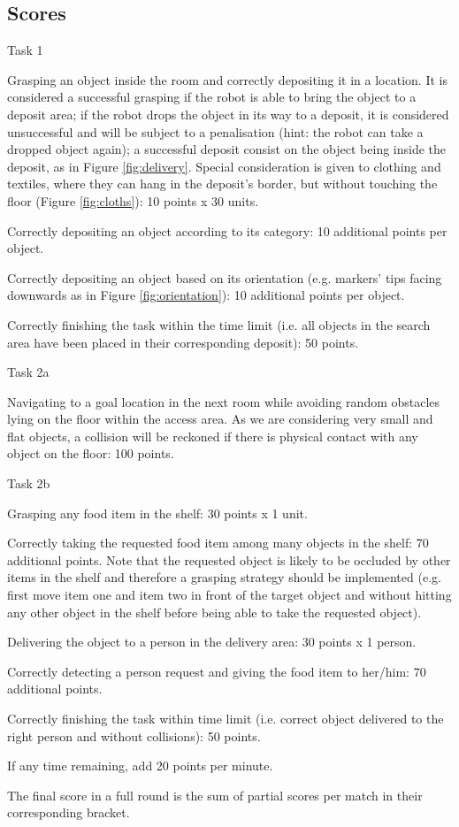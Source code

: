\documentclass{article}
\newcommand{\SubItem}[1]{
    {\setlength\itemindent{15pt} \item[-] #1}
}
\begin{document}
\subsection{Scores} \label{sec:scores}

\begin{itemize}
    \item Task 1
        \SubItem{Grasping an object inside the room and correctly depositing it in a location. It is considered a successful grasping if the robot is able to bring the object to a deposit area; if the robot drops the object in its way to a deposit, it is considered unsuccessful and will be subject to a penalisation (hint: the robot can take a dropped object again); a successful deposit consist on the object being inside the deposit, as in Figure \ref{fig:delivery}. Special consideration is given to clothing and textiles, where they can hang in the deposit's border, but without touching the floor (Figure \ref{fig:cloths}): 10 points x 30 units.}
        \SubItem{Correctly depositing an object according to its category: 10 additional points per object.}
        \SubItem{Correctly depositing an object based on its orientation (e.g. markers' tips facing downwards as in Figure \ref{fig:orientation}): 10 additional points per object.}
        \SubItem{Correctly finishing the task within the time limit (i.e. all objects in the search area have been placed in their corresponding deposit): 50 points.}
    \item Task 2a
        \SubItem{Navigating to a goal location in the next room while avoiding random obstacles lying on the floor within the access area. As we are considering very small and flat objects, a collision will be reckoned if there is physical contact with any object on the floor: 100 points.}
    \item Task 2b
        \SubItem{Grasping any food item in the shelf: 30 points x 1 unit.}
        \SubItem{Correctly taking the requested food item among many objects in the shelf: 70 additional points. Note that the requested object is likely to be occluded by other items in the shelf and therefore a grasping strategy should be implemented (e.g. first move item one and item two in front of the target object and without hitting any other object in the shelf before being able to take the requested object).}
        \SubItem{Delivering the object to a person in the delivery area: 30 points x 1 person.}
        \SubItem{Correctly detecting a person request and giving the food item to her/him: 70 additional points.}
        \SubItem{Correctly finishing the task within time limit (i.e. correct object delivered to the right person and without collisions): 50 points.}
        \SubItem{If any time remaining, add 20 points per minute.}
    \item The final score in a full round is the sum of partial scores per match in their corresponding bracket.
\end{itemize}
\end{document}
